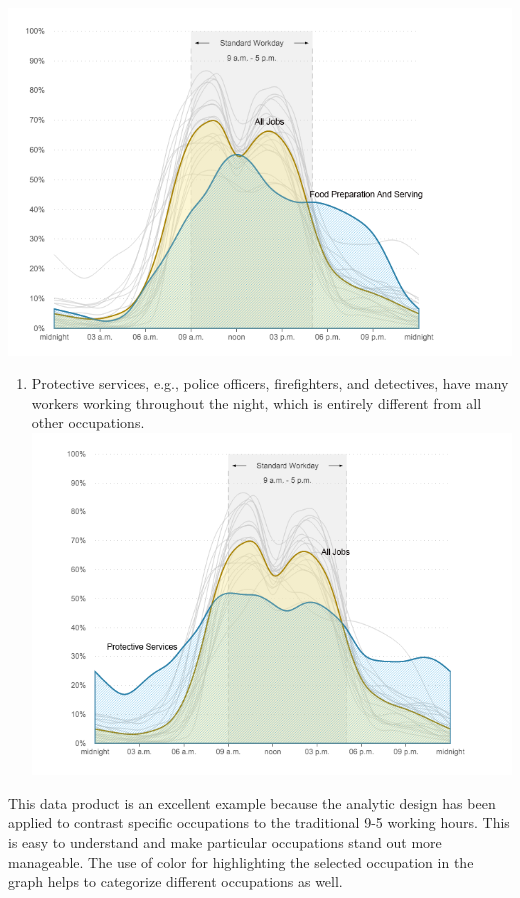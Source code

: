\documentclass[]{book}
\providecommand{\tightlist}{%
  \setlength{\itemsep}{0pt}\setlength{\parskip}{0pt}}
\begin{document}
\includegraphics{images/server_cook.png}

\begin{enumerate}
\def\labelenumi{\arabic{enumi}.}
\setcounter{enumi}{2}
\tightlist
\item
  Protective services, e.g., police officers, firefighters, and detectives, have many workers working throughout the night, which is entirely different from all other occupations.
  \includegraphics{images/protective.png}
\end{enumerate}

This data product is an excellent example because the analytic design has been applied to contrast specific occupations to the traditional 9-5 working hours. This is easy to understand and make particular occupations stand out more manageable. The use of color for highlighting the selected occupation in the graph helps to categorize different occupations as well.
\end{document}
